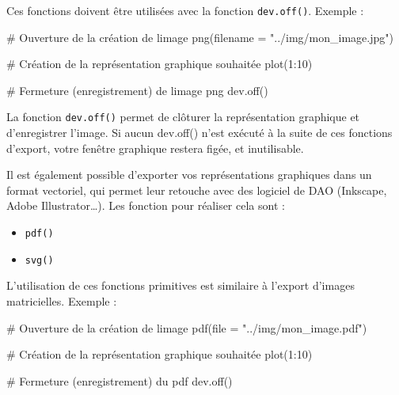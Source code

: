 \documentclass[
  letterpaper,
  DIV=11,
  numbers=noendperiod]{scrartcl}
\newenvironment{Shaded}{\begin{snugshade}}{\end{snugshade}}
\newcommand{\AttributeTok}[1]{\textcolor[rgb]{0.40,0.45,0.13}{#1}}
\newcommand{\CommentTok}[1]{\textcolor[rgb]{0.37,0.37,0.37}{#1}}
\newcommand{\DecValTok}[1]{\textcolor[rgb]{0.68,0.00,0.00}{#1}}
\newcommand{\FunctionTok}[1]{\textcolor[rgb]{0.28,0.35,0.67}{#1}}
\newcommand{\NormalTok}[1]{\textcolor[rgb]{0.00,0.23,0.31}{#1}}
\newcommand{\SpecialCharTok}[1]{\textcolor[rgb]{0.37,0.37,0.37}{#1}}
\newcommand{\StringTok}[1]{\textcolor[rgb]{0.13,0.47,0.30}{#1}}
\providecommand{\tightlist}{%
  \setlength{\itemsep}{0pt}\setlength{\parskip}{0pt}}\usepackage{longtable,booktabs,array}
\begin{document}
Ces fonctions doivent être utilisées avec la fonction
\texttt{dev.off()}. Exemple :

\begin{Shaded}
\begin{Highlighting}[]
\CommentTok{\# Ouverture de la création de l\textquotesingle{}image}
\FunctionTok{png}\NormalTok{(}\AttributeTok{filename =} \StringTok{"../img/mon\_image.jpg"}\NormalTok{)}

\CommentTok{\# Création de la représentation graphique souhaitée}
\FunctionTok{plot}\NormalTok{(}\DecValTok{1}\SpecialCharTok{:}\DecValTok{10}\NormalTok{)}

\CommentTok{\# Fermeture (enregistrement) de l\textquotesingle{}image png}
\FunctionTok{dev.off}\NormalTok{()}
\end{Highlighting}
\end{Shaded}

\begin{tcolorbox}[enhanced jigsaw, colframe=quarto-callout-important-color-frame, bottomtitle=1mm, colback=white, leftrule=.75mm, breakable, left=2mm, titlerule=0mm, toptitle=1mm, arc=.35mm, title=\textcolor{quarto-callout-important-color}{\faExclamation}\hspace{0.5em}{Important}, rightrule=.15mm, bottomrule=.15mm, toprule=.15mm, colbacktitle=quarto-callout-important-color!10!white, opacitybacktitle=0.6, opacityback=0, coltitle=black]

La fonction \texttt{dev.off()} permet de clôturer la représentation
graphique et d'enregistrer l'image. Si aucun dev.off() n'est exécuté à
la suite de ces fonctions d'export, votre fenêtre graphique restera
figée, et inutilisable.

\end{tcolorbox}

Il est également possible d'exporter vos représentations graphiques dans
un format vectoriel, qui permet leur retouche avec des logiciel de DAO
(Inkscape, Adobe Illustrator\ldots). Les fonction pour réaliser cela
sont :

\begin{itemize}
\tightlist
\item
  \texttt{pdf()}
\item
  \texttt{svg()}
\end{itemize}

L'utilisation de ces fonctions primitives est similaire à l'export
d'images matricielles. Exemple :

\begin{Shaded}
\begin{Highlighting}[]
\CommentTok{\# Ouverture de la création de l\textquotesingle{}image}
\FunctionTok{pdf}\NormalTok{(}\AttributeTok{file =} \StringTok{"../img/mon\_image.pdf"}\NormalTok{)}

\CommentTok{\# Création de la représentation graphique souhaitée}
\FunctionTok{plot}\NormalTok{(}\DecValTok{1}\SpecialCharTok{:}\DecValTok{10}\NormalTok{)}

\CommentTok{\# Fermeture (enregistrement) du pdf}
\FunctionTok{dev.off}\NormalTok{()}
\end{Highlighting}
\end{Shaded}
\end{document}

